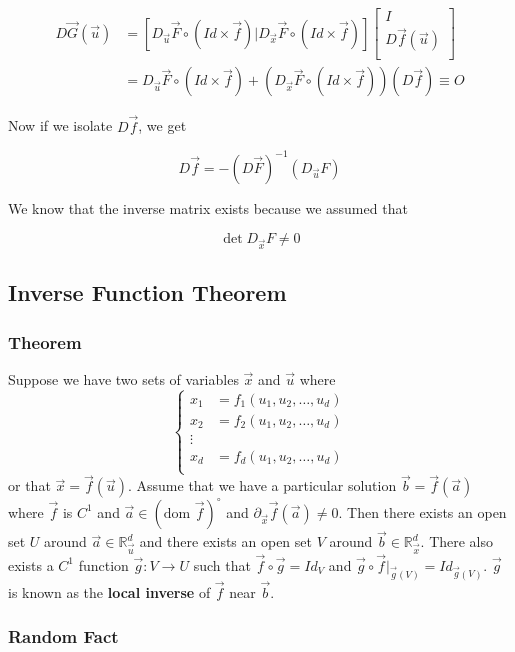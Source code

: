 \documentclass[11 pt, twoside]{article}
\begin{document}
\begin{align*}
D\vec{G}(\vec{u}) &= [D_{\vec{u}} \vec{F} \circ (Id \times \vec{f}) |
D_{\vec{x}} \vec{F} \circ (Id \times \vec{f})]\left[\begin{array}{c}
I \\
D\vec{f} (\vec{u})\\
\end{array}\right]\\
&= D_{\vec{u}} \vec{F} \circ (Id \times \vec{f}) + (D_{\vec{x}}
\vec{F} \circ (Id \times \vec{f}))(D\vec{f}) \equiv O
\end{align*}

Now if we isolate $D\vec{f}$, we get

\[
\boxed{D\vec{f} = - (D\vec{F})^{-1} (D_{\vec{u}} F)}
\]

We know that the inverse matrix exists because we assumed that

$$\det D_{\vec{x}} F \neq 0$$

\subsection{Inverse Function Theorem}
\subsubsection{Theorem}
Suppose we have two sets of variables $\vec{x}$ and $\vec{u}$ where
\[
\begin{cases}
x_1 &= f_1 (u_1, u_2, \dots, u_d) \\
x_2 &= f_2 (u_1, u_2, \dots, u_d) \\
\vdots & \\
x_d &= f_d (u_1, u_2, \dots, u_d)\\
\end{cases}
\]
or that $\vec{x} = \vec{f}(\vec{u})$. Assume that we have a particular solution
$\vec{b} = \vec{f}(\vec{a})$ where $\vec{f}$ is $C^1$ and $\vec{a} \in (\text{dom }
\vec{f})^\circ$ and $\partial_{\vec{x}} \vec{f}(\vec{a}) \neq 0$. Then there exists an open set $U$ around $\vec{a} \in
\mathbb{R}^d_{\vec{u}}$ and there exists an open set $V$ around $\vec{b} \in
\mathbb{R}^d_{\vec{x}}$. There also exists a $C^1$ function $\vec{g}: V \to
U$ such that $\vec{f} \circ \vec{g} = Id_V$ and $\vec{g} \circ
\vec{f}|_{\vec{g}(V)} = Id_{\vec{g}(V)}$. $\vec{g}$ is known as the \textbf{local inverse}
of $\vec{f}$ near $\vec{b}$.

\subsubsection{Random Fact}
\end{document}
